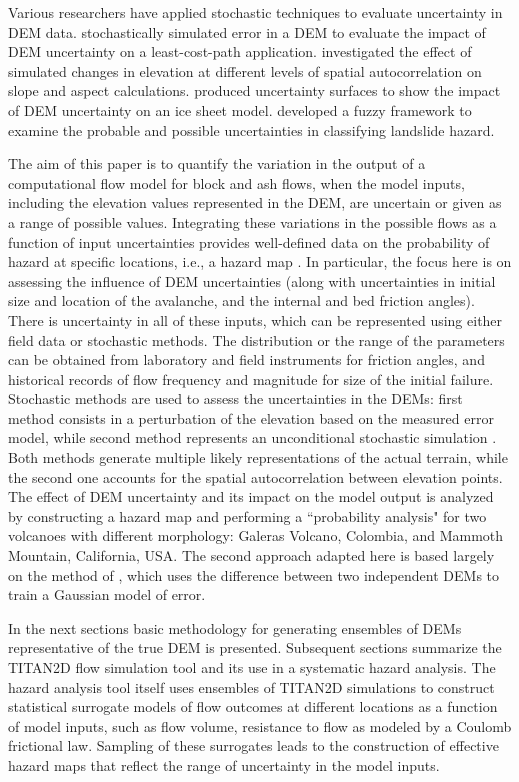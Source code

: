 \documentclass[12pt]{article}
\begin{document}
Various researchers have applied stochastic techniques to evaluate
uncertainty in DEM data. \citet{Ehlschlaeger_1996} stochastically
simulated error in a DEM to evaluate the impact of DEM uncertainty on
a least-cost-path application. \citet{Hunter_Goodchild_1997}
investigated the effect of simulated changes in elevation at different
levels of spatial autocorrelation on slope and aspect
calculations. \citet{Felix_Hebeler} produced uncertainty surfaces to
show the impact of DEM uncertainty on an ice sheet
model. \citet{Amii_Darnell} developed a fuzzy framework to examine the
probable and possible uncertainties in classifying landslide hazard.

The aim of this paper is to quantify the variation in the output of a
computational flow model for block and ash flows, when the model
inputs, including the elevation values represented in the DEM, are
uncertain or given as a range of possible values. Integrating these
variations in the possible flows as a function of input uncertainties
provides well-defined data on the probability of hazard at
specific locations, i.e., a hazard map \citep{Keith}.  In particular,
the focus here is on assessing the influence of DEM uncertainties (along with
uncertainties in initial size and location of the avalanche, and the
internal and bed friction angles).  There is uncertainty in all of
these inputs, which can be represented using either field data or
stochastic methods.  The distribution or the range of the parameters
can be obtained from laboratory and field instruments for friction
angles, and historical records of flow frequency and magnitude for
size of the initial failure.  Stochastic methods are used to assess
the uncertainties in the DEMs: first method consists in a perturbation of the elevation based
on the measured error model, while second method represents an unconditional stochastic
simulation \citep{Ehlschlaeger_1996}.  Both methods generate multiple
likely representations of the actual terrain, while the second one
accounts for the spatial autocorrelation between elevation points.
The effect of DEM uncertainty and its impact on the model output is
analyzed by constructing a hazard map and performing a ``probability
analysis" for two volcanoes with different morphology: Galeras
Volcano, Colombia, and Mammoth Mountain, California, USA.  
The second approach adapted here is based largely on the method of \citet{Ehlschlaeger_1996},
which uses the difference between two independent DEMs to train a
Gaussian model of error.

In the next sections basic methodology for generating
ensembles of DEMs representative of the true DEM is presented.  Subsequent sections
summarize the TITAN2D flow simulation tool and its use in a systematic
hazard analysis. The hazard analysis tool itself uses ensembles of
TITAN2D simulations to construct statistical surrogate models of flow
outcomes at different locations as a function of model inputs, such as
flow volume, resistance to flow as modeled by a Coulomb frictional
law.  Sampling of these surrogates leads to the construction of
effective hazard maps that reflect the range of uncertainty in the
model inputs.
\end{document}
